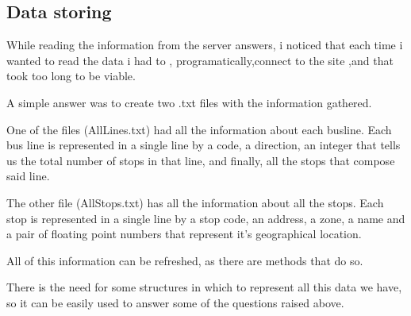 \documentclass[12pt]{article}
\begin{document}
\subsection{Data storing}

While reading the information from the server answers, i noticed that each time i wanted to read the data i had to , programatically,connect to the site ,and that took too long to be viable. 

A simple answer was to create two .txt files with the information gathered.

One of the files (AllLines.txt) had all the information about each busline.
Each bus line is represented in a single line by a code, a direction, an integer that tells us the total number of stops in that line, and finally, all the stops that compose said line.

The other file (AllStops.txt) has all the information about all the stops.
Each stop is represented in a single line by a stop code, an address, a zone, a name and a pair of floating point numbers that represent it's geographical location. 

All of this information can be refreshed, as there are methods that do so.

There is the need for some structures in which to represent all this data we have, so it can be easily used to answer some of the questions raised above.
\end{document}

